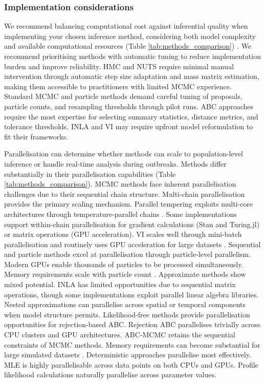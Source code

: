 \documentclass{article}
\begin{document}
\subsubsection{Implementation considerations}

We recommend balancing computational cost against inferential quality when implementing your chosen inference method, considering both model complexity and available computational resources (Table \ref{tab:methods_comparison}) \citep{funk2020choices}.
We recommend prioritising methods with automatic tuning to reduce implementation burden and improve reliability.
HMC and NUTS require minimal manual intervention through automatic step size adaptation and mass matrix estimation, making them accessible to practitioners with limited MCMC experience.
Standard MCMC and particle methods demand careful tuning of proposals, particle counts, and resampling thresholds through pilot runs.
ABC approaches require the most expertise for selecting summary statistics, distance metrics, and tolerance thresholds.
INLA and VI may require upfront model reformulation to fit their frameworks.

Parallelisation can determine whether methods can scale to population-level inference or handle real-time analysis during outbreaks.
Methods differ substantially in their parallelisation capabilities (Table \ref{tab:methods_comparison}).
MCMC methods face inherent parallelisation challenges due to their sequential chain structure.
Multi-chain parallelisation provides the primary scaling mechanism.
Parallel tempering exploits multi-core architectures through temperature-parallel chains \citep{surjanovic2023pigeons}.
Some implementations support within-chain parallelisation for gradient calculations (Stan and Turing.jl) or matrix operations (GPU acceleration).
VI scales well through mini-batch parallelisation and routinely uses GPU acceleration for large datasets \citep{hoffman2013stochastic, Abbott2021-delta}.
Sequential and particle methods excel at parallelisation through particle-level parallelism.
Modern GPUs enable thousands of particles to be processed simultaneously.
Memory requirements scale with particle count \citep{henriksen2012parallel}.
Approximate methods show mixed potential.
INLA has limited opportunities due to sequential matrix operations, though some implementations exploit parallel linear algebra libraries.
Nested approximations can parallelise across spatial or temporal components when model structure permits.
Likelihood-free methods provide parallelisation opportunities for rejection-based ABC.
Rejection ABC parallelises trivially across CPU clusters and GPU architectures.
ABC-MCMC retains the sequential constraints of MCMC methods.
Memory requirements can become substantial for large simulated datasets \citep{kulkarni2022hardware}.
Deterministic approaches parallelise most effectively.
MLE is highly parallelisable across data points on both CPUs and GPUs.
Profile likelihood calculations naturally parallelise across parameter values.
\end{document}
